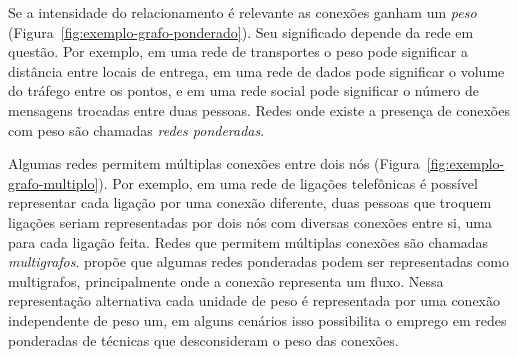 \documentclass[12pt,a4paper,final]{article}
\begin{document}
Se a intensidade do relacionamento é relevante as conexões ganham um \textit{peso} (Figura~\ref{fig:exemplo-grafo-ponderado}). Seu significado depende da rede em questão. Por exemplo, em uma rede de transportes o peso pode significar a distância entre locais de entrega, em uma rede de dados pode significar o volume do tráfego entre os pontos, e em uma rede social pode significar o número de mensagens trocadas entre duas pessoas. Redes onde existe a presença de conexões com peso são chamadas \textit{redes ponderadas}.

Algumas redes permitem múltiplas conexões entre dois nós (Figura~\ref{fig:exemplo-grafo-multiplo}). Por exemplo, em uma rede de ligações telefônicas é possível representar cada ligação por uma conexão diferente, duas pessoas que troquem ligações seriam representadas por dois nós com diversas conexões entre si, uma para cada ligação feita. Redes que permitem múltiplas conexões são chamadas \textit{multigrafos}.  propõe que algumas redes ponderadas podem ser representadas como multigrafos, principalmente onde a conexão representa um fluxo. Nessa representação alternativa cada unidade de peso é representada por uma conexão independente de peso um, em alguns cenários isso possibilita o emprego em redes ponderadas de técnicas que desconsideram o peso das conexões.
\end{document}
